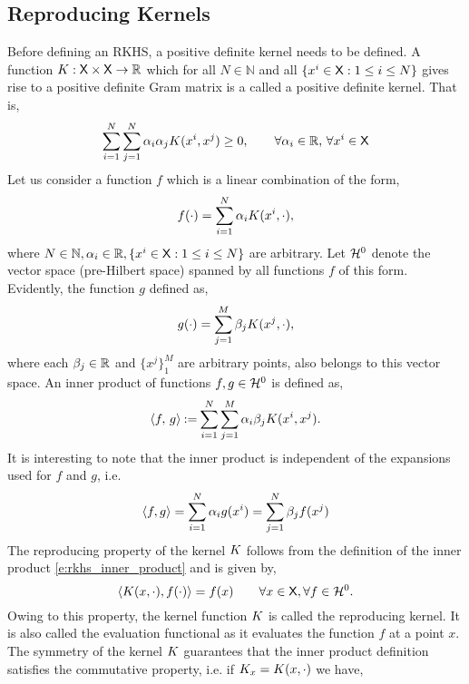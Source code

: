 \subsection{Reproducing Kernels} 
Before defining an RKHS, a positive definite kernel needs to be defined. A function $K : {\sf X} \times {\sf X} \to \mathbb{R}$ which for all $N \in \mathbb{N}$ and all $\{ x^i \in {\sf X}: 1\leq i \leq N \}$ gives rise to a positive definite Gram matrix is a called a positive definite kernel. That is, 
\begin{equation}
\sum_{i=1}^N \sum_{j=1}^N \alpha_i \alpha_j K(x^i,x^j) \geq 0, \qquad \forall \alpha_i \in \mathbb{R}, \, \forall x^i \in {\sf X} 
\end{equation}
Let us consider a function $f$ which is a linear combination of the form,
\begin{equation}
f(\cdot) = \sum_{i=1}^N \alpha_i \Kern(x^i, \cdot),
\label{e:rkhs_f_rkhs}
\end{equation}
where $N \in \mathbb{N}, \alpha_i \in \mathbb{R}, \{ x^i \in {\sf X}: 1\leq i \leq N \}$ are arbitrary. Let ${\cal H}^0$ denote the vector space (pre-Hilbert space) spanned by all functions $f$ of this form. Evidently, the function $g$ defined as,  
\begin{equation}
g(\cdot) = \sum_{j=1}^M \rkhsparam_j \Kern(x^j, \cdot),
\label{e:rkhs_g_rkhs}
\end{equation}
where each $\beta_j \in \mathbb{R}$ and $\{x^j\}_1^M$ are arbitrary points, also belongs to this vector space.  An inner product of functions $f,g \in {\cal H}^0$ is defined as,
\begin{equation}
\langle f,\, g \rangle \eqdef \sum_{i=1}^N \sum_{j=1}^M \alpha_i \rkhsparam_j \Kern(x^i, x^j).
\label{e:rkhs_inner_product}
\end{equation}
It is interesting to note that the inner product is independent of the expansions used for $f$ and $g$, i.e.
\begin{equation}
\langle f, g \rangle = \sum_{i=1}^N \alpha_i g(x^i) = \sum_{j=1}^N \beta_j f(x^j)
\end{equation}
The reproducing property of the kernel $K$ follows from the definition of the inner product \eqref{e:rkhs_inner_product} and is given by,
\begin{equation}
\langle \Kern(x,\cdot), f(\cdot)\rangle = f(x) \qquad \forall x \in \state, \forall f \in \clH^0.
\label{e:rkhs_rep_property}
\end{equation}
Owing to this property, the kernel function $K$ is called the reproducing kernel. It is also called the evaluation functional as it evaluates the function $f$ at a point $x$. The symmetry of the kernel $K$ guarantees that the inner product definition satisfies the commutative property, i.e. if $K_x = K(x, \cdot)$ we have,
